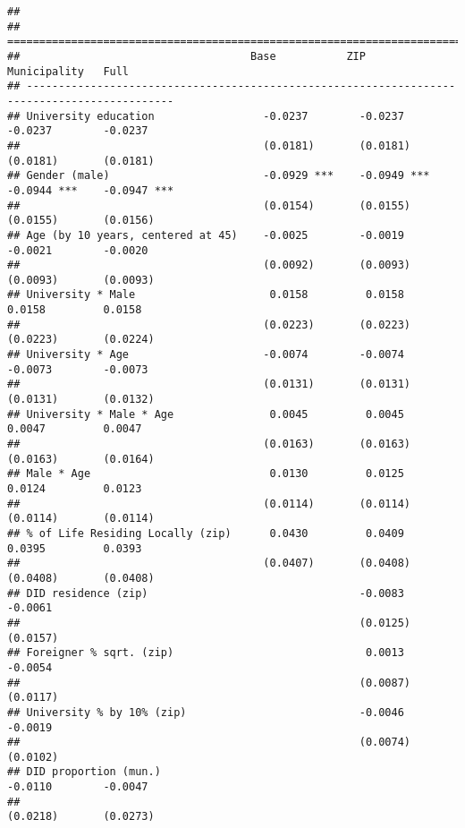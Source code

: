 \documentclass[
]{article}
\begin{document}
\begin{verbatim}
## 
## =============================================================================================
##                                    Base           ZIP            Municipality   Full         
## ---------------------------------------------------------------------------------------------
## University education                 -0.0237        -0.0237        -0.0237        -0.0237    
##                                      (0.0181)       (0.0181)       (0.0181)       (0.0181)   
## Gender (male)                        -0.0929 ***    -0.0949 ***    -0.0944 ***    -0.0947 ***
##                                      (0.0154)       (0.0155)       (0.0155)       (0.0156)   
## Age (by 10 years, centered at 45)    -0.0025        -0.0019        -0.0021        -0.0020    
##                                      (0.0092)       (0.0093)       (0.0093)       (0.0093)   
## University * Male                     0.0158         0.0158         0.0158         0.0158    
##                                      (0.0223)       (0.0223)       (0.0223)       (0.0224)   
## University * Age                     -0.0074        -0.0074        -0.0073        -0.0073    
##                                      (0.0131)       (0.0131)       (0.0131)       (0.0132)   
## University * Male * Age               0.0045         0.0045         0.0047         0.0047    
##                                      (0.0163)       (0.0163)       (0.0163)       (0.0164)   
## Male * Age                            0.0130         0.0125         0.0124         0.0123    
##                                      (0.0114)       (0.0114)       (0.0114)       (0.0114)   
## % of Life Residing Locally (zip)      0.0430         0.0409         0.0395         0.0393    
##                                      (0.0407)       (0.0408)       (0.0408)       (0.0408)   
## DID residence (zip)                                 -0.0083                       -0.0061    
##                                                     (0.0125)                      (0.0157)   
## Foreigner % sqrt. (zip)                              0.0013                       -0.0054    
##                                                     (0.0087)                      (0.0117)   
## University % by 10% (zip)                           -0.0046                       -0.0019    
##                                                     (0.0074)                      (0.0102)   
## DID proportion (mun.)                                              -0.0110        -0.0047    
##                                                                    (0.0218)       (0.0273)   

\end{verbatim}
\end{document}
